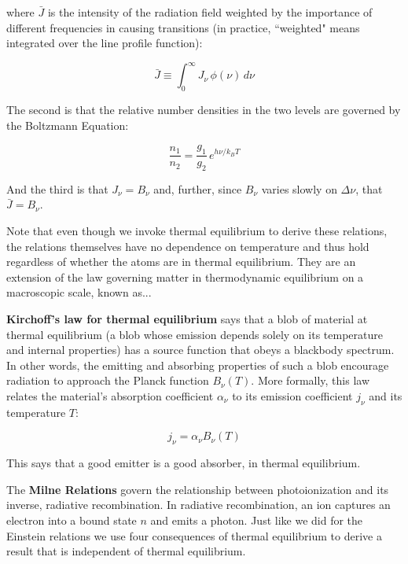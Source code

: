 \documentclass[12pt, letterpaper, preprint]{aastex}
\begin{document}
\begin{enumerate}
where $\bar{J}$ is the intensity of the radiation field
weighted by the importance of different frequencies
in causing transitions (in practice, ``weighted" means
integrated over the line profile function):

\begin{equation}
  \bar{J} \equiv \int_0^\infty J_\nu \, \phi(\nu) \, d\nu
  \label{jbar}
\end{equation}

The second is that the relative number densities in the two levels are governed by the Boltzmann Equation:

\begin{equation}
  \frac{n_1}{n_2} = \frac{g_1}{g_2} \, e^{h \nu / k_B T}
  \label{boltzmann-eq}
\end{equation}

And the third is that $J_\nu = B_\nu$ and, further, since
$B_\nu$ varies slowly on $\Delta \nu$, that $\bar{J} = B_\nu$. 

Note that even though we invoke thermal equilibrium to derive these relations, the relations themselves have no dependence on temperature and thus hold regardless of whether the atoms are in thermal equilibrium. They are an extension of the law governing matter in thermodynamic equilibrium on a macroscopic scale, known as...

\textbf{Kirchoff's law for thermal equilibrium}
says that a blob of material at thermal equilibrium
(a blob whose emission depends solely on its temperature
and internal properties)
has a source function that obeys a blackbody spectrum.
In other words, the emitting and absorbing properties
of such a blob encourage radiation to approach
the Planck function $B_\nu(T)$.
More formally, this law relates
the material's absorption coefficient $\alpha_\nu$
to its emission coefficient $j_\nu$
and its temperature $T$:

\begin{equation}
  j_\nu = \alpha_\nu B_\nu (T)
  \label{kirchoff-law}
\end{equation}

This says that a good emitter is a good absorber, in
thermal equilibrium.

The \textbf{Milne Relations} govern the relationship between
photoionization and its inverse, radiative recombination.
In radiative recombination, an ion captures an electron
into a bound state $n$ and emits a photon. 
Just like we did for the Einstein relations
we use four consequences of thermal equilibrium to
derive a result that is independent of thermal equilibrium. 


\end{enumerate}
\end{document}
